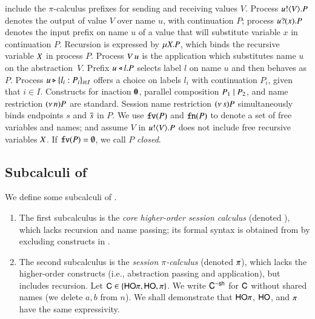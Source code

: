 include the
$\pi$-calculus prefixes for sending and receiving values $V$.
Process $u ! \langle V \rangle . P$ denotes the output of value $V$
over name $u$, with continuation $P$;
process $u ? (x) . P$ denotes the input prefix on name $u$ of a value
that 
will substitute variable $x$ in continuation $P$. 
Recursion is expressed by $\mu X. P$,
which binds the recursive variable $X$ in process $P$.
Process 
$V\, {u}$ 
is the application
which substitutes name $u$ on the abstraction~$V$. 
Prefix $u \triangleleft l . P$ selects label $l$ on name $u$ and then behaves as $P$.
Process $u \triangleright \{l_i: P_i\}_{i \in I}$ offers a choice on labels $l_i$ with
continuation $P_i$, given that $i \in I$.
Constructs for 
inaction $\mathbf{0}$,  parallel composition $P_1 \;|\; P_2$, and 
name restriction $(\nu\, n) P$ are standard.
Session name restriction $(\nu\, s) P$ simultaneously binds endpoints $s$ and $\overline{s}$ in $P$.
We use $\mathtt{fv}(P)$ and $\mathtt{fn}(P)$ to denote a set of free 
variables and names; 
and assume $V$ in $u ! \langle V \rangle .{P}$ does not include free recursive 
variables $X$. 
If $\mathtt{fv}(P) = \emptyset$, we call $P$ {\em closed}.

\subsection{Subcalculi of \HOp}
\label{subsec:subcalculi}
\noi
We define some subcalculi of \HOp. 
\begin{enumerate}[$\bullet$]
\item The first subcalculus is the 
{\em core higher-order session calculus} (denoted \HO),
which lacks recursion and name passing; its 
formal syntax is obtained from  by excluding 
constructs in .

\item The second subcalculus is 
the {\em session $\pi$-calculus} 
(denoted $\pi$), which 
lacks  the
higher-order constructs
(i.e., abstraction passing and application), but includes recursion.
Let $\mathsf{C} \in \{\mathsf{HO}\pi, \mathsf{HO}, \pi\}$. We write 
$\mathsf{C}^{-\mathsf{sh}}$ for $\mathsf{C}$ without shared names
(we delete $a,b$ from $n$). 
We shall demonstrate that 
$\mathsf{HO}\pi$, $\mathsf{HO}$, and $\pi$ have the same expressivity.
\end{enumerate}
